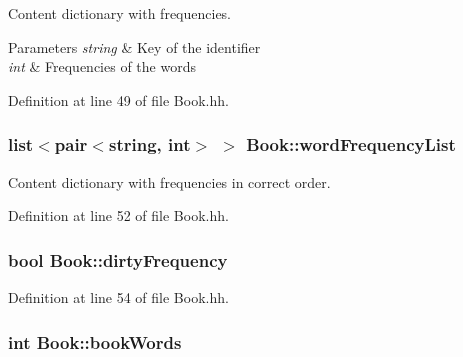 Content dictionary with frequencies. 


\begin{DoxyParams}{Parameters}
{\em string} & Key of the identifier \\
\hline
{\em int} & Frequencies of the words \\
\hline
\end{DoxyParams}


Definition at line 49 of file Book.\+hh.

\subsubsection[{\texorpdfstring{word\+Frequency\+List}{wordFrequencyList}}]{\setlength{\rightskip}{0pt plus 5cm}list$<$pair$<$string, int$>$ $>$ Book\+::word\+Frequency\+List\hspace{0.3cm}{\ttfamily [private]}}\hypertarget{class_book_aa9035db1c21cf61eb3af84ad69829069}{}\label{class_book_aa9035db1c21cf61eb3af84ad69829069}


Content dictionary with frequencies in correct order. 



Definition at line 52 of file Book.\+hh.

\subsubsection[{\texorpdfstring{dirty\+Frequency}{dirtyFrequency}}]{\setlength{\rightskip}{0pt plus 5cm}bool Book\+::dirty\+Frequency\hspace{0.3cm}{\ttfamily [private]}}\hypertarget{class_book_ad1df1050750f0605efdfab51b86c0765}{}\label{class_book_ad1df1050750f0605efdfab51b86c0765}


Definition at line 54 of file Book.\+hh.

\subsubsection[{\texorpdfstring{book\+Words}{bookWords}}]{\setlength{\rightskip}{0pt plus 5cm}int Book\+::book\+Words\hspace{0.3cm}{\ttfamily [private]}}\hypertarget{class_book_a36f1e0b30a0ad17606976556cab45a23}{}\label{class_book_a36f1e0b30a0ad17606976556cab45a23}


